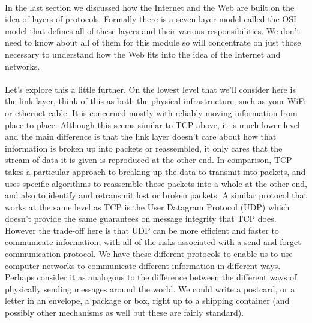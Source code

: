 \paragraph{} In the last section we discussed how the Internet and the Web are built on the idea of layers of protocols. Formally there is a seven layer model called the OSI model that defines all of these layers and their various responsibilities. We don't need to know about all of them for this module so will concentrate on just those necessary to understand how the Web fits into the idea of the Internet and networks.
\paragraph{} Let's explore this a little further. On the lowest level that we'll consider here is the link layer, think of this as both the physical infrastructure, such as your WiFi or ethernet cable. It is concerned mostly with reliably moving information from place to place. Although this seems similar to TCP above, it is much lower level and the main difference is that the link layer doesn't care about how that information is broken up into packets or reassembled, it only cares that the stream of data it is given is reproduced at the other end. In comparison, TCP takes a particular approach to breaking up the data to transmit into packets, and uses specific algorithms to reassemble those packets into a whole at the other end, and also to identify and retransmit lost or broken packets. A similar protocol that works at the same level as TCP is the User Datagram Protocol (UDP) which doesn't provide the same guarantees on message integrity that TCP does. However the trade-off here is that UDP can be more efficient and faster to communicate information, with all of the risks associated with a send and forget communication protocol. We have these different protocols to enable us to use computer networks to communicate different information in different ways. Perhaps consider it as analogous to the difference between the different ways of physically sending messages around the world. We could write a postcard, or a letter in an envelope, a package or box, right up to a shipping container (and possibly other mechanisms as well but these are fairly standard).
